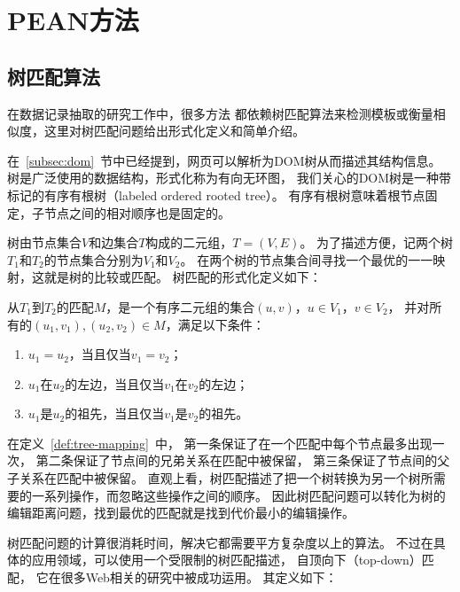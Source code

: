 \section{PEAN方法}
\label{sec:pean-method}

\subsection{树匹配算法}
\label{subsec:tree-match}

在数据记录抽取的研究工作中，很多方法
都依赖树匹配算法来检测模板或衡量相似度，这里对树匹配问题给出形式化定义和简单介绍。

在~\ref{subsec:dom}~节中已经提到，网页可以解析为DOM树从而描述其结构信息。
树是广泛使用的数据结构，形式化称为有向无环图，
我们关心的DOM树是一种带标记的有序有根树（labeled ordered rooted tree）。
有序有根树意味着根节点固定，子节点之间的相对顺序也是固定的。

树由节点集合$V$和边集合$T$构成的二元组，$T=(V,E)$。
为了描述方便，记两个树$T_1$和$T_2$的节点集合分别为$V_1$和$V_2$。
在两个树的节点集合间寻找一个最优的一一映射，这就是树的比较或匹配。
树匹配的形式化定义如下：

\begin{definition}
\label{def:tree-mapping}
从$T_1$到$T_2$的匹配$M$，是一个有序二元组的集合$(u,v)$，$u \in V_1$，$v \in V_2$，
并对所有的$(u_1,v_1), (u_2,v_2) \in M$，满足以下条件：
\begin{enumerate}
\item $u_1 = u_2$，当且仅当$v_1 = v_2$；
\item $u_1$在$u_2$的左边，当且仅当$v_1$在$v_2$的左边；
\item $u_1$是$u_2$的祖先，当且仅当$v_1$是$v_2$的祖先。
\end{enumerate}
\end{definition}

在定义~\ref{def:tree-mapping}~中，
第一条保证了在一个匹配中每个节点最多出现一次，
第二条保证了节点间的兄弟关系在匹配中被保留，
第三条保证了节点间的父子关系在匹配中被保留。
直观上看，树匹配描述了把一个树转换为另一个树所需要的一系列操作，而忽略这些操作之间的顺序。
因此树匹配问题可以转化为树的编辑距离问题，找到最优的匹配就是找到代价最小的编辑操作。

树匹配问题的计算很消耗时间，解决它都需要平方复杂度以上的算法。
不过在具体的应用领域，可以使用一个受限制的树匹配描述，
自顶向下（top-down）匹配，
它在很多Web相关的研究中被成功运用。
其定义如下：

